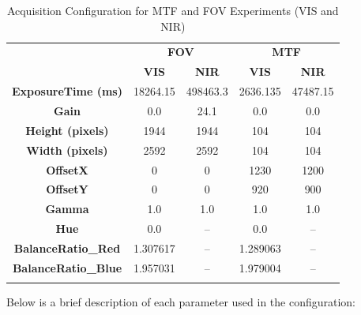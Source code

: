 \begin{longtable}[c]{c|cc|cc}
\hline
\rowcolor[HTML]{EFEFEF} 
\cellcolor[HTML]{EFEFEF} &
  \multicolumn{2}{c|}{\cellcolor[HTML]{EFEFEF}\textbf{FOV}} &
  \multicolumn{2}{c}{\cellcolor[HTML]{EFEFEF}\textbf{MTF}} \\
\rowcolor[HTML]{EFEFEF} 
\multirow{-2}{*}{\cellcolor[HTML]{EFEFEF}\textbf{Parameter}} &
  \textbf{VIS} &
  \textbf{NIR} &
  \textbf{VIS} &
  \textbf{NIR} \\ \hline
\endfirsthead
%
\endhead
%
\hline
\endfoot
%
\endlastfoot
%
\textbf{ExposureTime (ms)}  & 18264.15 & 498463.3 & 2636.135 & 47487.15 \\
\rowcolor[HTML]{EFEFEF} 
\textbf{Gain}               & 0.0      & 24.1     & 0.0      & 0.0      \\
\textbf{Height (pixels)}    & 1944     & 1944     & 104      & 104      \\
\rowcolor[HTML]{EFEFEF} 
\textbf{Width (pixels)}     & 2592     & 2592     & 104      & 104      \\
\textbf{OffsetX}            & 0        & 0        & 1230     & 1200     \\
\rowcolor[HTML]{EFEFEF} 
\textbf{OffsetY}            & 0        & 0        & 920      & 900      \\
\textbf{Gamma}              & 1.0      & 1.0      & 1.0      & 1.0      \\
\rowcolor[HTML]{EFEFEF} 
\textbf{Hue}                & 0.0      & --       & 0.0      & --       \\
\textbf{BalanceRatio\_Red}  & 1.307617 & --       & 1.289063 & --       \\
\rowcolor[HTML]{EFEFEF} 
\textbf{BalanceRatio\_Blue} & 1.957031 & --       & 1.979004 & --       \\ \hline
\caption{Acquisition Configuration for MTF and FOV Experiments (VIS and NIR)}
\label{tab:tab:fov_mtf}\\
\end{longtable}

Below is a brief description of each parameter used in the configuration:

